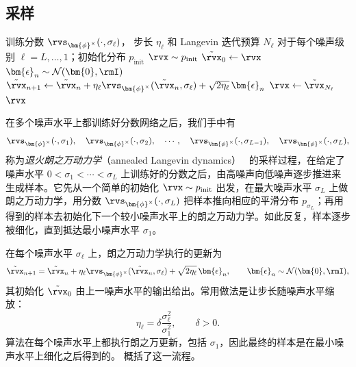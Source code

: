 \subsection{采样}


\begin{algorithm}[th]
\caption{\label{alg:smld} 退火 Langevin Dynamics}
\begin{algorithmic}[1]
\Require 训练分数 $\rvs_{\bm{\phi}^\times}(\cdot,\sigma_\ell)$，
步长 $\eta_\ell$ 和 Langevin 迭代预算 $N_\ell$
对于每个噪声级别 $\ell=L,\ldots,1$；初始化分布
$p_{\mathrm{init}}$
\State $\rvx \sim p_{\mathrm{init}}$
\Statex{}
    \State $\tilde{\rvx}_0 \gets \rvx$
    \Statex{}
        \State $\bm{\epsilon}_n \sim \mathcal{N}(\bm{0},\rmI)$
        \State $\tilde{\rvx}_{n+1}
        \gets
        \tilde{\rvx}_n
        +\eta_\ell
        \rvs_{\bm{\phi}^\times}(\tilde{\rvx}_n,\sigma_\ell)
        +\sqrt{2\eta_\ell}\,\bm{\epsilon}_n$
    \EndFor
    \State $\rvx \gets \tilde{\rvx}_{N_\ell}$
    \Statex{}
\EndFor
\Ensure $\rvx$
\end{algorithmic}
\end{algorithm}


在多个噪声水平上都训练好分数网络之后，我们手中有
\[
\rvs_{\bm{\phi}^\times}(\cdot, \sigma_1), \quad\rvs_{\bm{\phi}^\times}(\cdot, \sigma_2), \quad \cdots, \quad \rvs_{\bm{\phi}^\times}(\cdot, \sigma_{L-1}), \quad    \rvs_{\bm{\phi}^\times}(\cdot, \sigma_L),
\]
称为\emph{退火朗之万动力学}（annealed Langevin dynamics）~\citep{song2019generative} 的采样过程，在给定了噪声水平 $0<\sigma_1<\cdots<\sigma_L$ 上训练好的分数之后，由高噪声向低噪声逐步推进来生成样本。它先从一个简单的初始化 $\rvx\sim p_{\mathrm{init}}$ 出发，在最大噪声水平 $\sigma_L$ 上做朗之万动力学，用分数 $\rvs_{\bm{\phi}^\times}(\cdot,\sigma_L)$ 把样本推向相应的平滑分布 $p_{\sigma_L}$；再用得到的样本去初始化下一个较小噪声水平上的朗之万动力学。如此反复，样本逐步被细化，直到抵达最小噪声水平 $\sigma_1$。

在每个噪声水平 $\sigma_\ell$ 上，朗之万动力学执行的更新为
\[
\tilde{\rvx}_{n+1}
=
\tilde{\rvx}_n
+
\eta_\ell
\rvs_{\bm{\phi}^\times}(\tilde{\rvx}_n,\sigma_\ell)
+
\sqrt{2\eta_\ell}\,\bm{\epsilon}_n,
\qquad
\bm{\epsilon}_n\sim\mathcal{N}(\bm{0},\rmI),
\]
其初始化 $\tilde{\rvx}_0$ 由上一噪声水平的输出给出。常用做法是让步长随噪声水平缩放：
\[
\eta_\ell
=
\delta\frac{\sigma_\ell^2}{\sigma_1^2},
\qquad
\delta>0.
\]
算法在每个噪声水平上都执行朗之万更新，包括 $\sigma_1$，因此最终的样本是在最小噪声水平上细化之后得到的。 概括了这一流程。

